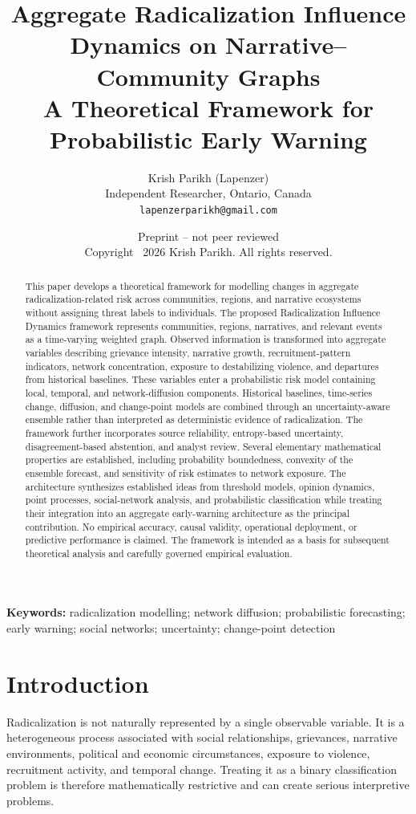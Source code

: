 \documentclass[11pt,letterpaper]{article}
\title{\textbf{Aggregate Radicalization Influence Dynamics on Narrative--Community Graphs}\\\large A Theoretical Framework for Probabilistic Early Warning}
\author{Krish Parikh (Lapenzer)\\Independent Researcher, Ontario, Canada\\\texttt{lapenzerparikh@gmail.com}}
\date{Preprint -- not peer reviewed\\Copyright \textcopyright\ 2026 Krish Parikh. All rights reserved.}
\begin{document}
\maketitle

\begin{abstract}
This paper develops a theoretical framework for modelling changes in aggregate radicalization-related risk across communities, regions, and narrative ecosystems without assigning threat labels to individuals. The proposed Radicalization Influence Dynamics framework represents communities, regions, narratives, and relevant events as a time-varying weighted graph. Observed information is transformed into aggregate variables describing grievance intensity, narrative growth, recruitment-pattern indicators, network concentration, exposure to destabilizing violence, and departures from historical baselines. These variables enter a probabilistic risk model containing local, temporal, and network-diffusion components. Historical baselines, time-series change, diffusion, and change-point models are combined through an uncertainty-aware ensemble rather than interpreted as deterministic evidence of radicalization. The framework further incorporates source reliability, entropy-based uncertainty, disagreement-based abstention, and analyst review. Several elementary mathematical properties are established, including probability boundedness, convexity of the ensemble forecast, and sensitivity of risk estimates to network exposure. The architecture synthesizes established ideas from threshold models, opinion dynamics, point processes, social-network analysis, and probabilistic classification while treating their integration into an aggregate early-warning architecture as the principal contribution. No empirical accuracy, causal validity, operational deployment, or predictive performance is claimed. The framework is intended as a basis for subsequent theoretical analysis and carefully governed empirical evaluation.
\end{abstract}

\noindent\textbf{Keywords:} radicalization modelling; network diffusion; probabilistic forecasting; early warning; social networks; uncertainty; change-point detection

\section{Introduction}
Radicalization is not naturally represented by a single observable variable. It is a heterogeneous process associated with social relationships, grievances, narrative environments, political and economic circumstances, exposure to violence, recruitment activity, and temporal change. Treating it as a binary classification problem is therefore mathematically restrictive and can create serious interpretive problems.
\end{document}

